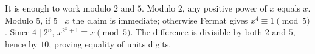 It is enough to work modulo $2$ and $5$. Modulo $2$, any positive power of $x$ equals $x$. Modulo $5$, if $5\mid x$ the claim is immediate; otherwise Fermat gives $x^4\equiv1\pmod5$. Since $4\mid2^n$, $x^{2^n+1}\equiv x\pmod5$. The difference is divisible by both $2$ and $5$, hence by $10$, proving equality of units digits.
